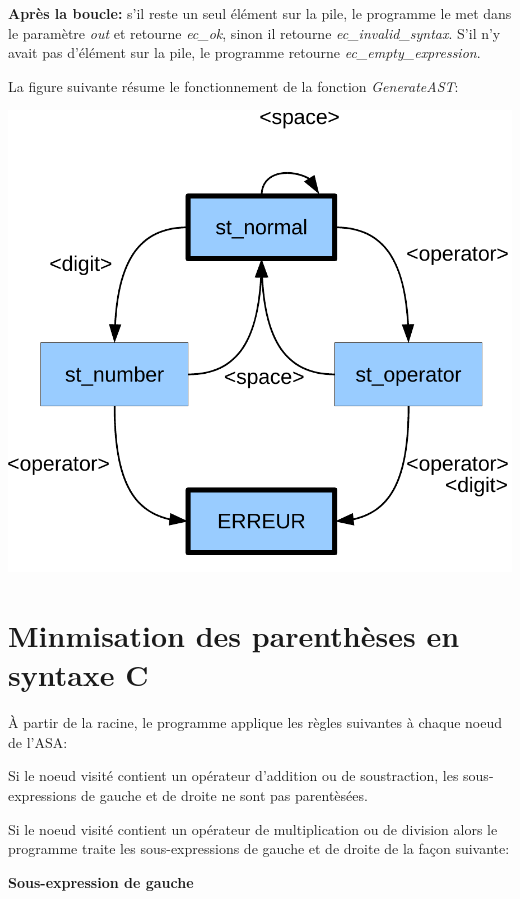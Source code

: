 \documentclass[10pt]{report}
\begin{document}
\textbf{Après la boucle:} s'il reste un seul élément sur la pile, le programme
le met dans le paramètre \emph{out} et retourne \emph{ec\_ok}, sinon il
retourne \emph{ec\_invalid\_syntax}.  S'il n'y avait pas d'élément sur la
pile, le programme retourne \emph{ec\_empty\_expression}.

La figure suivante résume le fonctionnement de la fonction \emph{GenerateAST}:

\begin{center}
  \includegraphics[scale=0.33]{statemachine}
\end{center}


\newpage

\section{Minmisation des parenthèses en syntaxe C}
À partir de la racine, le programme applique les règles suivantes à chaque noeud de
l'ASA:

Si le noeud visité contient un opérateur d'addition ou de soustraction,
les sous-expressions de gauche et de droite ne sont pas parentèsées.

Si le noeud visité contient un opérateur de multiplication ou de division
alors le programme traite les sous-expressions de gauche et de droite de la
façon suivante:

\textbf{Sous-expression de gauche}
\end{document}
